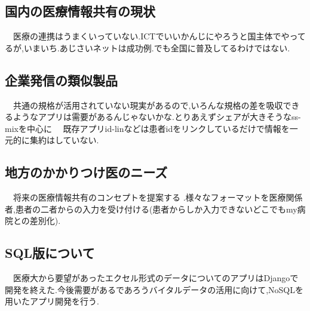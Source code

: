 \subsection{国内の医療情報共有の現状}
　医療の連携はうまくいっていない.ICTでいいかんじにやろうと国主体でやってるが,いまいち.あじさいネットは成功例.でも全国に普及してるわけではない.\cite{bibi3}

\subsection{企業発信の類似製品}
　共通の規格が活用されていない現実があるので,いろんな規格の差を吸収できるようなアプリは需要があるんじゃないかな.とりあえずシェアが大きそうなss-mixを中心に
　既存アプリid-linなどは患者idをリンクしているだけで情報を一元的に集約はしていない.

\subsection{地方のかかりつけ医のニーズ}
　将来の医療情報共有のコンセプトを提案する .様々なフォーマットを医療関係者,患者の二者からの入力を受け付ける(患者からしか入力できないどこでもmy病院との差別化).

\subsection{SQL版について}
　医療大から要望があったエクセル形式のデータについてのアプリはDjangoで開発を終えた.今後需要があるであろうバイタルデータの活用に向けて,NoSQLを用いたアプリ開発を行う.

